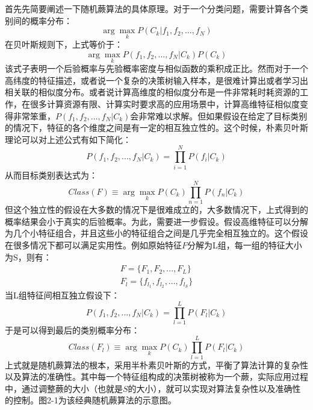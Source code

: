 首先先简要阐述一下随机蕨算法的具体原理。对于一个分类问题，需要计算各个类别间的概率分布：
\begin{equation}
	\arg\max_{k} P(C_k|f_1,f_2,...,f_N)
\end{equation}
在贝叶斯规则下，上式等价于：
\begin{equation}
	\arg\max_{k} P(f_1,f_2,...,f_N|C_k)P(C_k)
\end{equation}
该式子表明一个后验概率与先验概率密度与相似函数的乘积成正比。然而对于一个高纬度的特征描述，或者说一个复杂的决策树输入样本，是很难计算出或者学习出相关联的相似度分布。或者说计算高维度的相似度分布是一件非常耗时耗资源的工作，在很多计算资源有限、计算实时要求高的应用场景中，计算高维特征相似度变得非常笨重，$P(f_1,f_2,...,f_N|C_k)$会非常难以求解。但如果假设在给定了目标类别的情况下，特征的各个维度之间是有一定的相互独立性的。这个时候，朴素贝叶斯理论可以对上述公式有如下简化：
\begin{equation}
	P(f_1,f_2,...,f_N|C_k)=\prod_{i=1}^N P(f_i|C_k)
\end{equation}
从而目标类别表达式为：
\begin{equation}
	Class(F)\equiv \arg\max_k P(C_k)\prod_{n=1}^N P(f_n|C_k)
\end{equation}
但这个独立性的假设在大多数的情况下是很难成立的，大多数情况下，上式得到的概率结果会小于真实的后验概率。为此，需要进一步假设。假设高维特征可以分解为几个小特征组合，并且这些小的特征组合之间是几乎完全相互独立的。这个假设在很多情况下都可以满足实用性。例如原始特征$F$分解为L组，每一组的特征大小为S，则有：
\begin{equation}
\begin{aligned}
	F=\{F_1,F_2,...,F_L\} \\
	F_l=\{f_{l_1},f_{l_2},...,f_{l_S}\}
\end{aligned}
\end{equation}
当L组特征间相互独立假设下：
\begin{equation}
	P(f_1,f_2,...,f_N|C_k)=\prod_{l=1}^L P(F_l|C_k)
\end{equation}
于是可以得到最后的类别概率分布：
\begin{equation}
	Class(F_l)\equiv \arg\max_k P(C_k)\prod_{l=1}^L P(F_l|C_k)
\end{equation}
上式就是随机蕨算法的根本，采用半朴素贝叶斯的方式，平衡了算法计算的复杂性以及算法的准确性。其中每一个特征组构成的决策树被称为一个蕨，实际应用过程中，通过调整蕨的大小（也就是$S$的大小），就可以实现对算法复杂性以及准确性的控制。图2-1为该经典随机蕨算法的示意图。
